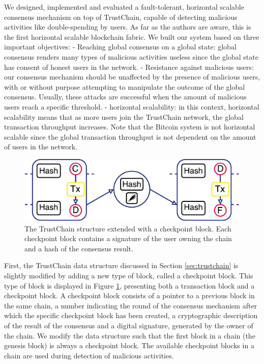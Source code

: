 \documentclass[USenglish]{article}
\begin{document}
We designed, implemented and evaluated a fault-tolerant, horizontal scalable consensus mechanism on top of TrustChain, capable of detecting malicious activities like double-spending by users.
As far as the authors are aware, this is the first horizontal scalable blockchain fabric.
We built our system based on three important objectives:
- Reaching global consensus on a global state: global consensus renders many types of malicious activities useless since the global state has consent of honest users in the network.
- Resistance against malicious users: our consensus mechanism should be unaffected by the presence of malicious users, with or without purpose attempting to manipulate the outcome of the global consensus. Usually, these attacks are successful when the amount of malicious users reach a specific threshold.
- horizontal scalability: in this context, horizontal scalability means that as more users join the TrustChain network, the global transaction throughput increases. Note that the Bitcoin system is not horizontal scalable since the global transaction throughput is not dependent on the amount of users in the network.

\begin{figure}[h!]
	\centering
	\includegraphics[width=0.8\columnwidth]{assets/trustchain_cp}
	\caption{The TrustChain structure extended with a checkpoint block. Each checkpoint block contains a signature of the user owning the chain and a hash of the consensus result.}
	\label{fig:trustchain_cp}
\end{figure}

First, the TrustChain data structure discussed in Section \ref{sec:trustchain} is slightly modified by adding a new type of block, called a checkpoint block.
This type of block is displayed in Figure \ref{fig:trustchain_cp}, presenting both a transaction block and a checkpoint block.
A checkpoint block consists of a pointer to a previous block in the same chain, a number indicating the round of the consensus mechanism after which the specific checkpoint block has been created, a cryptographic description of the result of the consensus and a digital signature, generated by the owner of the chain.
We modify the data structure such that the first block in a chain (the genesis block) is always a checkpoint block.
The available checkpoint blocks in a chain are used during detection of malicious activities.
\end{document}
